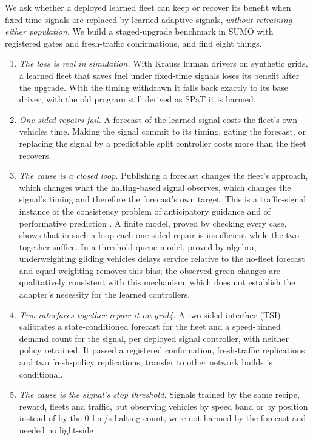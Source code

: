 We ask whether a deployed learned fleet can keep or recover its benefit when fixed-time signals are replaced by learned adaptive signals,
\emph{without retraining either population}. We build a staged-upgrade benchmark in SUMO \cite{lopez2018} with registered gates and
fresh-traffic confirmations, and find eight things.
\begin{enumerate}\setlength\itemsep{1pt}
\item \emph{The loss is real in simulation.} With Krauss human drivers on synthetic grids, a learned fleet that saves fuel under fixed-time signals loses its benefit after the upgrade. With the
timing withdrawn it falls back exactly to its base driver; with the old program still derived as SPaT it is harmed.
\item \emph{One-sided repairs fail.} A forecast of the learned signal costs the fleet's own vehicles time. Making the signal commit to
its timing, gating the forecast, or replacing the signal by a predictable split controller costs more than the fleet recovers.
\item \emph{The cause is a closed loop.} Publishing a forecast changes the fleet's approach, which changes what the halting-based signal
observes, which changes the signal's timing and therefore the forecast's own target. This is a traffic-signal instance of the consistency
problem of anticipatory guidance \cite{bottom2000} and of performative prediction \cite{perdomo2020,narang2023}. A finite model, proved by
checking every case, shows that in such a loop each one-sided repair is insufficient while the two together suffice. In a threshold-queue model, proved by algebra, underweighting gliding vehicles delays service relative to the no-fleet forecast and equal weighting removes this bias; the observed green changes are qualitatively consistent with this mechanism, which does not establish the adapter's necessity for the learned controllers.
\item \emph{Two interfaces together repair it on grid4.} A two-sided interface (TSI) calibrates a state-conditioned forecast for
the fleet and a speed-binned demand count for the signal, per deployed signal controller, with neither policy retrained. It passed a
registered confirmation, fresh-traffic replications and two fresh-policy replications; transfer to other network builds is conditional.
\item \emph{The cause is the signal's stop threshold.} Signals trained by the same recipe, reward, fleets and traffic, but observing
vehicles by speed band or by position instead of by the 0.1\,m/s halting count, were not harmed by the forecast and needed no light-side

\end{enumerate}
